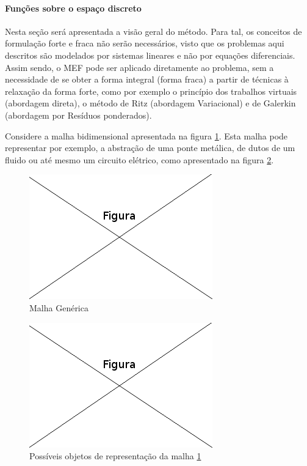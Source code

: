 \paragraph{Funções sobre o espaço discreto \\}

Nesta seção será apresentada a visão geral do método. Para tal, os conceitos de formulação forte e fraca não serão necessários, visto que os problemas aqui descritos são modelados por sistemas lineares e não por equações diferenciais. Assim sendo, o MEF pode ser aplicado diretamente ao problema, sem a necessidade de se obter a forma integral (forma fraca) a partir de técnicas à relaxação da forma forte, como por exemplo o princípio dos trabalhos virtuais (abordagem direta), o método de Ritz (abordagem Variacional) e de Galerkin (abordagem por Resíduos ponderados).

Considere a malha bidimensional  apresentada na figura \ref{fig:malhaGenerica}. Esta malha pode representar por exemplo, a abstração de uma ponte metálica, de dutos de um fluido ou até mesmo um circuito elétrico, como apresentado na figura \ref{fig:repMalhaGenerica}.
\begin{figure}[!htb]
\centering
\includegraphics[scale=0.5]{figuras/temp.png}
\caption{Malha Genérica}
\label{fig:malhaGenerica}
\end{figure}

\begin{figure}[!htb]
\centering
\includegraphics[scale=0.5]{figuras/temp.png}
\caption{Possíveis objetos de representação da malha \ref{fig:malhaGenerica}}
\label{fig:repMalhaGenerica}
\end{figure}


